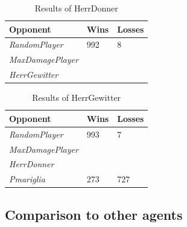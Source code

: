 \begin{table}[h]
    \centering
    \begin{tabular}{|l|l|l|}
    \hline 
    \textbf{Opponent}      & Wins & Losses \\
    \hline 
    \emph{RandomPlayer}    & 992  & 8      \\
    \hline 
    \emph{MaxDamagePlayer} &      &        \\
    \hline 
    \emph{HerrGewitter}    &      &        \\
    \hline 
    \end{tabular}
    \caption{Results of HerrDonner}
    \label{tab:HerrDonner}
\end{table}
\begin{table}[h]
    \centering
    \begin{tabular}{|l|l|l|}
    \hline 
    \textbf{Opponent}      & Wins   & Losses \\
    \hline 
    \emph{RandomPlayer}    & 993    & 7 \\
    \hline 
    \emph{MaxDamagePlayer} &        &        \\
    \hline 
    \emph{HerrDonner}       &       &        \\
    \hline 
    \emph{Pmariglia}        & 273   & 727 \\
    \hline
    \end{tabular}
    \caption{Results of HerrGewitter}
    \label{tab:HerrGewitter}
\end{table}

\subsection{Comparison to other agents}

